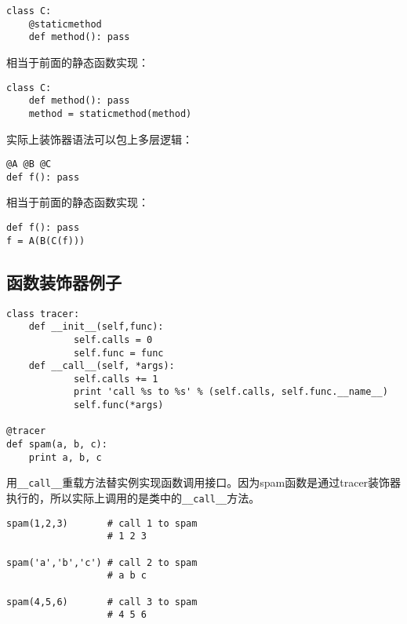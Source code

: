\begin{lstlisting}
class C:
	@staticmethod
	def method(): pass
\end{lstlisting}

相当于前面的静态函数实现：

\begin{lstlisting}
class C:
	def method(): pass
	method = staticmethod(method)
\end{lstlisting}

实际上装饰器语法可以包上多层逻辑：

\begin{lstlisting}
@A @B @C
def f(): pass
\end{lstlisting}

相当于前面的静态函数实现：

\begin{lstlisting}
def f(): pass
f = A(B(C(f)))
\end{lstlisting}

\subsection{函数装饰器例子}

\begin{lstlisting}
class tracer:
    def __init__(self,func):
            self.calls = 0
            self.func = func
    def __call__(self, *args):
            self.calls += 1
            print 'call %s to %s' % (self.calls, self.func.__name__)
            self.func(*args)

@tracer
def spam(a, b, c):
    print a, b, c
\end{lstlisting}

用\verb|__call__|重载方法替实例实现函数调用接口。因为spam函数是通过tracer装饰器执行的，所以实际上调用的是类中的\verb|__call__|方法。

\begin{lstlisting}
spam(1,2,3)       # call 1 to spam
                  # 1 2 3

spam('a','b','c') # call 2 to spam
                  # a b c

spam(4,5,6)       # call 3 to spam
                  # 4 5 6
\end{lstlisting}

